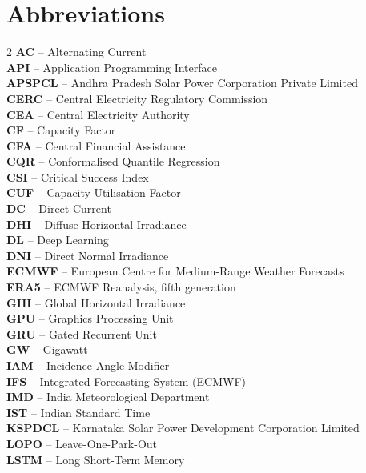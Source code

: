 \documentclass[12pt]{report}
\begin{document}
\chapter*{Abbreviations}
\begin{multicols}{2}\small
\noindent
\textbf{AC} -- Alternating Current\\
\textbf{API} -- Application Programming Interface\\
\textbf{APSPCL} -- Andhra Pradesh Solar Power Corporation Private Limited\\
\textbf{CERC} -- Central Electricity Regulatory Commission\\
\textbf{CEA} -- Central Electricity Authority\\
\textbf{CF} -- Capacity Factor\\
\textbf{CFA} -- Central Financial Assistance\\
\textbf{CQR} -- Conformalised Quantile Regression\\
\textbf{CSI} -- Critical Success Index\\
\textbf{CUF} -- Capacity Utilisation Factor\\
\textbf{DC} -- Direct Current\\
\textbf{DHI} -- Diffuse Horizontal Irradiance\\
\textbf{DL} -- Deep Learning\\
\textbf{DNI} -- Direct Normal Irradiance\\
\textbf{ECMWF} -- European Centre for Medium-Range Weather Forecasts\\
\textbf{ERA5} -- ECMWF Reanalysis, fifth generation\\
\textbf{GHI} -- Global Horizontal Irradiance\\
\textbf{GPU} -- Graphics Processing Unit\\
\textbf{GRU} -- Gated Recurrent Unit\\
\textbf{GW} -- Gigawatt\\
\textbf{IAM} -- Incidence Angle Modifier\\
\textbf{IFS} -- Integrated Forecasting System (ECMWF)\\
\textbf{IMD} -- India Meteorological Department\\
\textbf{IST} -- Indian Standard Time\\
\textbf{KSPDCL} -- Karnataka Solar Power Development Corporation Limited\\
\textbf{LOPO} -- Leave-One-Park-Out\\
\textbf{LSTM} -- Long Short-Term Memory\\

\end{multicols}
\end{document}
